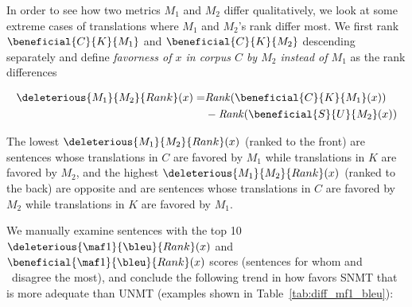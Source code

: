 In order to see how two metrics $M_1$ and $M_2$ differ qualitatively, we look at some extreme cases of translations where $M_1$ and $M_2$'s rank differ most. We first rank $\beneficial{C}{K}{M_1}$ and $\beneficial{C}{K}{M_2}$ descending separately and define \textit{favorness of $x$ in corpus $C$ by $M_2$ instead of $M_1$} as the rank differences

\begin{equation}
\begin{split}
    \deleterious{M_1}{M_2}{Rank}(x) = &\mathit{Rank}(\beneficial{C}{K}{M_1}(x)) \\
&- \mathit{Rank}(\beneficial{S}{U}{M_2}(x))
\end{split}
\label{eq:favorness}
\end{equation}

The lowest $\deleterious{M_1}{M_2}{Rank}(x)$ (ranked to the front) are sentences whose translations in $C$ are favored by $M_1$ while translations in $K$ are favored by $M_2$, and the highest $\deleterious{M_1}{M_2}{Rank}(x)$ (ranked to the back) are opposite and are sentences whose translations in $C$ are favored by $M_2$ while translations in $K$ are favored by $M_1$.

We manually examine sentences with the top 10 $\deleterious{\maf1}{\bleu}{Rank}(x)$ and $\beneficial{\maf1}{\bleu}{Rank}(x)$ scores (sentences for whom  and \bleu\ disagree the most), and conclude the following trend in how  favors SNMT that is more adequate than UNMT (examples shown in Table~\ref{tab:diff_mf1_bleu}):

